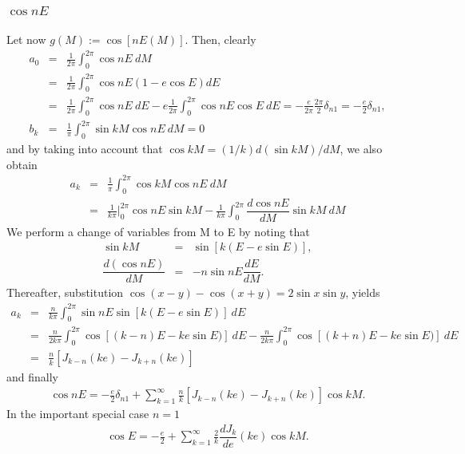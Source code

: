 \documentclass [12pt, a4paper] {article}
\newcommand{\diff}[2]
{
	\dfrac{d #1}{d #2}
}
\begin{document}
\subsubsection{$\cos nE$}
Let now $g(M) := \cos [nE(M)]$. Then, clearly
\begin {eqnarray}
    a_0 &=& \frac{1}{2\pi}\int_0^{2\pi} \cos nE\:dM 
    \\
    &=& 
    \frac{1}{2\pi}\int_0^{2\pi}
    \cos nE(1 - e \cos E)dE
    \\
    &=& 
    \frac{1}{2\pi}\int_0^{2\pi}
    \cos nE\:dE 
    - 
    e
    \frac{1}{2\pi}\int_0^{2\pi}\cos nE\cos E\: dE
    =
    -\frac{e}{2\pi}\frac{2\pi}{2}\delta_{n1}
    = 
    -\frac{e}{2}\delta_{n1},
    \\
    b_k &=& \frac{1}{\pi}\int_0^{2\pi}\sin kM\cos nE\: dM = 0
\end {eqnarray}
and by taking into account that $\cos kM = (1/k) d(\sin kM)/dM$, we also obtain
\begin {eqnarray}
    a_k 
    &=& 
    \frac{1}{\pi}\int_0^{2\pi}\cos kM\cos nE\: dM 
    \\
    &=&
    \frac{1}{k\pi}
    \Big|_0^{2\pi}\cos nE\sin kM 
    - 
    \frac{1}{k\pi}
    \int_0^{2\pi}
    \diff{\cos nE}{M}\sin kM\:dM
\end {eqnarray}
We perform a change of variables from M to E by noting that 
\begin {eqnarray}
    \sin kM &=& \sin[k(E - e\sin E)], \\
    \diff{(\cos nE)}{M} &=& -n\sin{nE}\diff{E}{M}.
\end {eqnarray}
Thereafter, substitution $\cos (x - y) - \cos (x + y) = 2\sin x\sin y$, yields
\begin {eqnarray}
    a_k 
    &=& 
    \frac{n}{k\pi}
    \int_{0}^{2\pi}
    \sin nE\sin[k(E - e\sin E)]
    \:dE
    \\
    &=& 
    \frac{n}{2k\pi}
    \int_{0}^{2\pi}
    \cos[(k-n)E - ke\sin E)]
    \:dE
    -
    \frac{n}{2k\pi}
    \int_{0}^{2\pi}
    \cos[(k+n)E - ke\sin E)]
    \:dE
    \\
    &=& 
    \frac{n}{k}\left[
        J_{k-n}(ke)
        -
        J_{k+n}(ke)
    \right]
\end {eqnarray}
and finally 
\begin {eqnarray}
    \cos nE 
    =
    -\frac{e}{2}\delta_{n1}
    +
    \sum_{k=1}^\infty
    \frac{n}{k}[
        J_{k-n}(ke)
        -
        J_{k+n}(ke)
    ]\cos kM.
\end {eqnarray}
In the important special case $n=1$
\begin {eqnarray}
    \cos E 
    =
    - \frac{e}{2}
    +
    \sum_{k=1}^\infty
    \frac{2}{k}
    \diff{J_k}{e}(ke)
    \cos kM.
\end {eqnarray}
\end{document}
